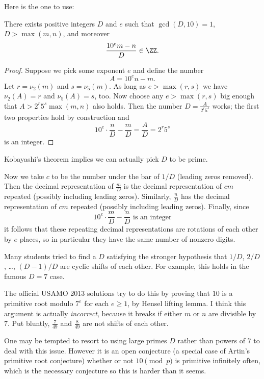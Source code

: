 \documentclass[11pt]{scrartcl}
\begin{document}
Here is the one to use:
\begin{claim*}
  There exists positive integers $D$ and $e$
  such that $\gcd(D,10)=1$, $D > \max(m,n)$,
  and moreover \[ \frac{ 10^e m - n }{ D } \in \ZZ. \]
\end{claim*}
\begin{proof}
  Suppose we pick some exponent $e$ and define the number
  \[ A = 10^e n - m. \]
  Let $r = \nu_2(m)$ and $s = \nu_5(m)$.
  As long as $e > \max(r,s)$ we have $\nu_2(A) = r$ and $\nu_5(A) = s$, too.
  Now choose any $e > \max(r,s)$ big enough that $A > 2^r 5^s \max(m,n)$ also holds.
  Then the number $D = \frac{A}{2^r 5^s}$ works;
  the first two properties hold by construction and
  \[ 10^e \cdot \frac nD - \frac mD
    = \frac{A}{D} = 2^r 5^s \]
  is an integer.
\end{proof}
\begin{remark*}
  Kobayashi's theorem implies we can actually pick $D$ to be prime.
\end{remark*}
Now we take $c$ to be the
number under the bar of $1/D$ (leading zeros removed).
Then the decimal representation of $\frac mD$
is the decimal representation of $cm$ repeated
(possibly including leading zeros).
Similarly, $\frac nD$ has the decimal representation of $cm$ repeated (possibly including leading zeros).
Finally, since
\[ 10^e \cdot \frac mD - \frac nD \text{ is an integer} \]
it follows that these repeating decimal representations are rotations of each other by $e$ places,
so in particular they have the same number of nonzero digits.


\begin{remark*}
  Many students tried to find a $D$ satisfying the stronger hypothesis
  that $1/D$, $2/D$, \dots, $(D-1)/D$
  are cyclic shifts of each other.
  For example, this holds in the famous $D = 7$ case.

  The official USAMO 2013 solutions try to do this by proving
  that $10$ is a primitive root modulo $7^e$
  for each $e \ge 1$, by Hensel lifting lemma.
  I think this argument is actually \emph{incorrect},
  because it breaks if either $m$ or $n$ are divisible by $7$.
  Put bluntly, $\frac{7}{49}$ and $\frac{8}{49}$
  are not shifts of each other.

  One may be tempted to resort to using large primes $D$
  rather than powers of $7$ to deal with this issue.
  However it is an open conjecture
  (a special case of Artin's primitive root conjecture)
  whether or not $10 \pmod p$ is primitive infinitely often,
  which is the necessary conjecture
  so this is harder than it seems.
\end{remark*}
\pagebreak
\end{document}
